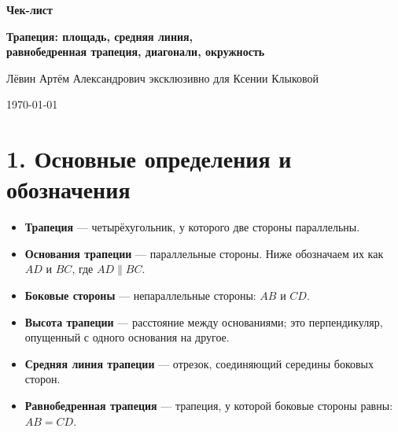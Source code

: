 \documentclass[a4paper,12pt]{article}
\begin{document}
\begin{titlepage}
\centering
\vspace*{2.2cm}

{\Huge\bfseries \textcolor{darkaccent}{Чек-лист}\par}
\vspace{0.8cm}
{\LARGE\bfseries \textcolor{textgray}{Трапеция: площадь, средняя линия,}\\[0.2em]
\textcolor{textgray}{равнобедренная трапеция, диагонали, окружность}\par}

\vspace{2cm}

{\Large \textcolor{textgray}{Лёвин Артём Александрович эксклюзивно для Ксении Клыковой}\par}

\vspace{0.8cm}
{\large \today\par}

\vfill


\vspace*{0.8cm}
\end{titlepage}

\section*{\textcolor{darkaccent}{1. Основные определения и обозначения}}

\begin{itemize}
    \item \textbf{Трапеция} --- четырёхугольник, у которого две стороны параллельны.
    \item \textbf{Основания трапеции} --- параллельные стороны. Ниже обозначаем их как $AD$ и $BC$, где $AD \parallel BC$.
    \item \textbf{Боковые стороны} --- непараллельные стороны: $AB$ и $CD$.
    \item \textbf{Высота трапеции} --- расстояние между основаниями; это перпендикуляр, опущенный с одного основания на другое.
    \item \textbf{Средняя линия трапеции} --- отрезок, соединяющий середины боковых сторон.
    \item \textbf{Равнобедренная трапеция} --- трапеция, у которой боковые стороны равны: $AB=CD$.
\end{itemize}
\end{document}
